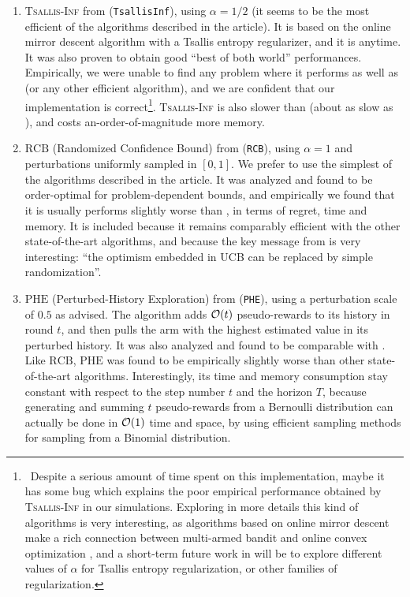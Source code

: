 \begin{enumerate}
    \item
    \textsc{Tsallis-Inf} from \cite{Zimmert2018} (\texttt{TsallisInf}), using $\alpha=1/2$ (it seems to be the most efficient of the algorithms described in the article).
    It is based on the online mirror descent algorithm with a Tsallis entropy regularizer, and it is anytime.
    It was also proven to obtain good ``best of both world'' performances.
    Empirically, we were unable to find any problem where it performs as well as \UCB{} (or any other efficient algorithm), and we are confident that our implementation is correct\footnote{~Despite a serious amount of time spent on this implementation, maybe it has some bug which explains the poor empirical performance obtained by \textsc{Tsallis-Inf} in our simulations. Exploring in more details this kind of algorithms is very interesting, as algorithms based on online mirror descent make a rich connection between multi-armed bandit and online convex optimization \cite{Hazan2016introduction}, and a short-term future work in \SMPyBandits{} will be to explore different values of $\alpha$ for Tsallis entropy regularization, or other families of regularization.}.
    \textsc{Tsallis-Inf} is also slower than \UCB{} (about as slow as \KLUCBswitch), and costs an-order-of-magnitude more memory.

    \item
    $\mathrm{RCB}$ (Randomized Confidence Bound) from \cite{KimTewari2019} (\texttt{RCB}), using $\alpha=1$ and perturbations uniformly sampled in $[0,1]$. We prefer to use the simplest of the algorithms described in the article.
    It was analyzed and found to be order-optimal for problem-dependent bounds, and empirically we found that it is usually performs slightly worse than \UCB, in terms of regret, time and memory.
    It is included because it remains comparably efficient with the other state-of-the-art algorithms, and because the key message from \cite{KimTewari2019} is very interesting:
    ``the optimism embedded in UCB can be replaced by simple randomization''.

    \item
    $\mathrm{PHE}$ (Perturbed-History Exploration) from \cite{KvetonSzepesvari2019} (\texttt{PHE}), using a perturbation scale of $0.5$ as advised.
    The algorithm adds $\mathcal{O}(t)$ \iid{} pseudo-rewards to its history in round $t$, and then pulls the arm with the highest estimated value in its perturbed history.
    It was also analyzed and found to be comparable with \UCB.
    Like $\mathrm{RCB}$, $\mathrm{PHE}$ was found to be empirically slightly worse than other state-of-the-art algorithms.
    Interestingly, its time and memory consumption stay constant with respect to the step number $t$ and the horizon $T$, because generating and summing $t$ pseudo-rewards from a Bernoulli distribution can actually be done in $\mathcal{O}(1)$ time and space, by using efficient sampling methods for sampling from a Binomial distribution.
\end{enumerate}

